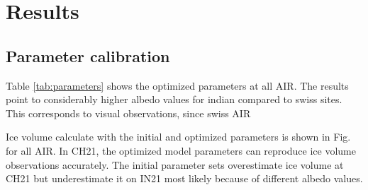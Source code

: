 \documentclass[utf8]{frontiersSCNS} %
\begin{document}

\section{Results} 
\subsection{Parameter calibration}
Table \ref{tab:parameters} shows the optimized parameters at all AIR. The results point to considerably higher albedo
values for indian compared to swiss sites. This corresponds to visual observations, since swiss AIR 

Ice volume calculate with the initial and optimized parameters is shown in Fig. for all AIR. In CH21, the optimized
model parameters can reproduce ice volume observations accurately. The initial parameter sets overestimate ice volume at
CH21 but underestimate it on IN21 most likely because of different albedo values.
\end{document}
